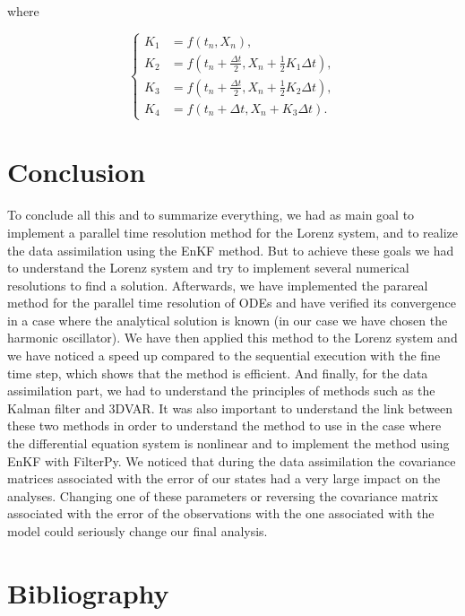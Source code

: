 \documentclass[12pt]{article}
\begin{document}
		\noindent where 
		
		$$\left\{\begin{aligned}
			K_1&=f(t_n,X_n) , \\
			K_2&=f\left(t_n+\frac{\Delta t}{2},X_n+\frac{1}{2} K_1\Delta t\right) , \\
			K_3&=f\left(t_n+\frac{\Delta t}{2},X_n+\frac{1}{2} K_2\Delta t\right) , \\
			K_4&=f\left(t_n+\Delta t,X_n+K_3\Delta t\right) .
		\end{aligned}\right.$$
	
    

	
	\newpage
	
	
	
	\newpage
	
		

	\newpage

	\section{Conclusion}
	
	\noindent To conclude all this and to summarize everything, we had as main goal to implement a parallel time resolution method for the Lorenz system, and to realize the data assimilation using the EnKF method. But to achieve these goals we had to understand the Lorenz system and try to implement several numerical resolutions to find a solution. Afterwards, we have implemented the parareal method for the parallel time resolution of ODEs and have verified its convergence in a case where the analytical solution is known (in our case we have chosen the harmonic oscillator). We have then applied this method to the Lorenz system and we have noticed a speed up compared to the sequential execution with the fine time step, which shows that the method is efficient. And finally, for the data assimilation part, we had to understand the principles of methods such as the Kalman filter and 3DVAR. It was also important to understand the link between these two methods in order to understand the method to use in the case where the differential equation system is nonlinear and to implement the method using EnKF with FilterPy. We noticed that during the data assimilation the covariance matrices associated with the error of our states had a very large impact on the analyses. Changing one of these parameters or reversing the covariance matrix associated with the error of the observations with the one associated with the model could seriously change our final analysis. 
	
	\newpage
	
	\section*{Bibliography}
	
	\printbibliography[heading=subbibintoc,keyword=ref,title={References}]
	
	\newpage
	
	\printbibliography[heading=subbibintoc,keyword=doc,title={Documentation}]
	
	\appendix
	
		
	
\end{document}

